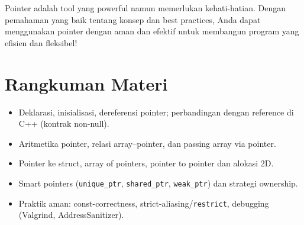 \documentclass[../main.tex]{subfiles}
\begin{document}
Pointer adalah tool yang powerful namun memerlukan kehati-hatian. Dengan pemahaman yang baik tentang konsep dan best practices, Anda dapat menggunakan pointer dengan aman dan efektif untuk membangun program yang efisien dan fleksibel!

\section{Rangkuman Materi}
\begin{itemize}
  \item Deklarasi, inisialisasi, dereferensi pointer; perbandingan dengan reference di C++ (kontrak non-null).
  \item Aritmetika pointer, relasi array–pointer, dan passing array via pointer.
  \item Pointer ke struct, array of pointers, pointer to pointer dan alokasi 2D.
  \item Smart pointers (\texttt{unique\_ptr}, \texttt{shared\_ptr}, \texttt{weak\_ptr}) dan strategi ownership.
  \item Praktik aman: const-correctness, strict-aliasing/\texttt{restrict}, debugging (Valgrind, AddressSanitizer).
\end{itemize}
\end{document}

